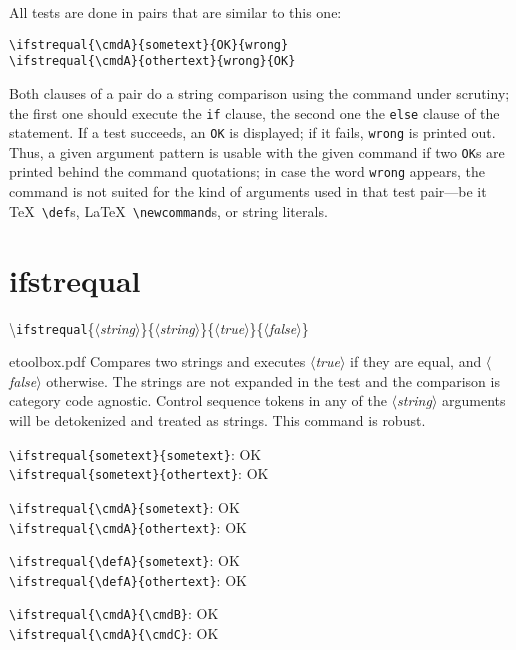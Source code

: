 \documentclass[a5paper,10pt,german]{article}
\newcommand{\cmdA}{sometext}
\newcommand{\cmdB}{sometext}
\newcommand{\cmdC}{othertext}
\def\defA{sometext}
\newcommand{\cmditem}[5]{\textbackslash \texttt{#1}\{\prm{#2}\}\{\prm{#3}\}\{\prm{#4}\}\{\prm{#5}\}}
\newcommand{\prm}[1]{$\langle$\textit{\thinspace #1\thinspace}$\rangle$}
\begin{document}
All tests are done in pairs that are similar to this one:

\verb#\ifstrequal{\cmdA}{sometext}{OK}{wrong}#\\
\verb#\ifstrequal{\cmdA}{othertext}{wrong}{OK}#

Both clauses of a pair do a string comparison using the command under scrutiny; the first one should execute
the \verb#if# clause, the second one the \verb#else# clause of the statement. If a test succeeds, an
\verb#OK# is displayed; if it fails, \verb#wrong# is printed out. Thus, a given argument pattern is usable
with the given command if two \verb#OK#s are printed behind the command quotations; in case the word
\verb#wrong# appears, the command is not suited for the kind of arguments used in that test pair—be it \TeX\
\verb#\def#s, \LaTeX\ \verb#\newcommand#s, or string literals.

\newpage
\section{ifstrequal}

\cmditem{ifstrequal}{string}{string}{true}{false}

\begin{shadequote}{etoolbox.pdf}
Compares two strings and executes \prm{true} if they are equal, and \prm{false} otherwise. The strings are
not expanded in the test and the comparison is category code agnostic. Control sequence tokens in any of the
\prm{string} arguments will be detokenized and treated as strings. This command is robust.
\end{shadequote}


\verb#\ifstrequal{sometext}{sometext}#:      \ifstrequal{sometext}{sometext}{OK}{wrong}\\
\verb#\ifstrequal{sometext}{othertext}#:     \ifstrequal{sometext}{othertext}{wrong}{OK}

\verb#\ifstrequal{\cmdA}{sometext}#:      \ifstrequal{\cmdA}{sometext}{OK}{wrong}\\
\verb#\ifstrequal{\cmdA}{othertext}#:     \ifstrequal{\cmdA}{othertext}{wrong}{OK}

\verb#\ifstrequal{\defA}{sometext}#:      \ifstrequal{\defA}{sometext}{OK}{wrong}\\
\verb#\ifstrequal{\defA}{othertext}#:     \ifstrequal{\defA}{othertext}{wrong}{OK}

\verb#\ifstrequal{\cmdA}{\cmdB}#:         \ifstrequal{\cmdA}{\cmdB}{OK}{wrong}\\
\verb#\ifstrequal{\cmdA}{\cmdC}#:         \ifstrequal{\cmdA}{\cmdC}{wrong}{OK}
\end{document}
